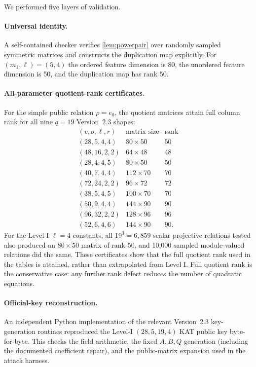 \documentclass[runningheads]{llncs}
\begin{document}
We performed five layers of validation.

\paragraph{Universal identity.}
A self-contained checker verifies \cref{lem:powerpair} over randomly sampled symmetric matrices and constructs the duplication map explicitly.  For $(m_1,\ell)=(5,4)$ the ordered feature dimension is 80, the unordered feature dimension is 50, and the duplication map has rank 50.

\paragraph{All-parameter quotient-rank certificates.}
For the simple public relation $\rho=e_0$, the quotient matrices attain full
column rank for all nine $q=19$ Version~2.3 shapes:
\[
\begin{array}{c|c|c}
(v,o,\ell,r)&\text{matrix size}&\text{rank}\\\hline
(28,5,4,4)&80\times50&50\\
(48,16,2,2)&64\times48&48\\
(28,4,4,5)&80\times50&50\\
(40,7,4,4)&112\times70&70\\
(72,24,2,2)&96\times72&72\\
(38,5,4,5)&100\times70&70\\
(50,9,4,4)&144\times90&90\\
(96,32,2,2)&128\times96&96\\
(52,6,4,6)&144\times90&90.
\end{array}
\]
For the Level-I $\ell=4$ constants, all $19^3=6{,}859$ scalar projective
relations tested also produced an $80\times50$ matrix of rank 50, and 10,000
sampled module-valued relations did the same.  These certificates show that the
full quotient rank used in the tables is attained, rather than extrapolated from
Level I.  Full quotient rank is the conservative case: any further rank defect
reduces the number of quadratic equations.

\paragraph{Official-key reconstruction.}
An independent Python implementation of the relevant Version~2.3 key-generation routines reproduced the Level-I $(28,5,19,4)$ KAT public key byte-for-byte.  This checks the field arithmetic, the fixed $A,B,Q$ generation (including the documented coefficient repair), and the public-matrix expansion used in the attack harness.
\end{document}
